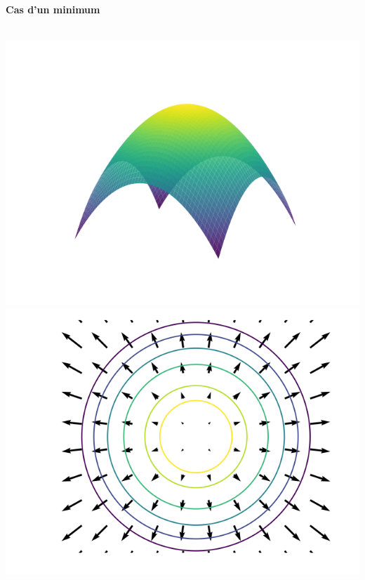 \documentclass[11pt,class=report,crop=false]{standalone}
\begin{document}
\begin{center}
\begin{minipage}{0.30\textwidth}
\quad\textbf{Cas d'un minimum}
\end{minipage}
\begin{minipage}{0.30\textwidth}
  \center

  \ \ \includegraphics[scale=\myscale,scale=0.35]{figures/gradient-surface-2}\\

\includegraphics[scale=\myscale,scale=0.35]{figures/gradient-surface-5b}


\end{minipage}
\end{center}
\end{document}
